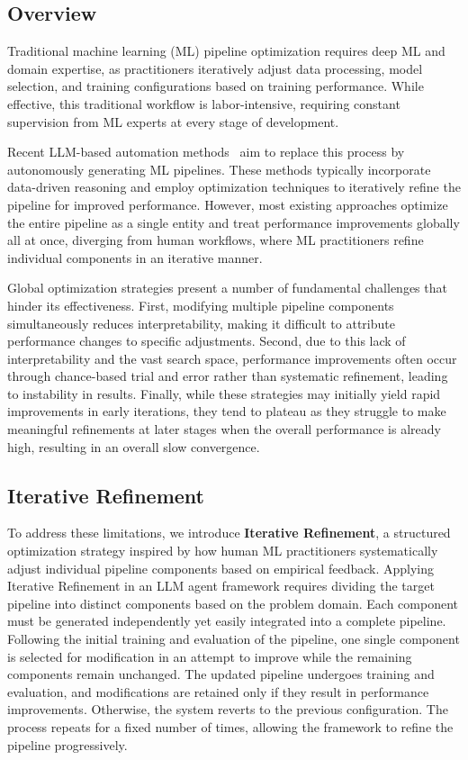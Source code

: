 \label{sec:method}
\subsection{Overview}
Traditional machine learning (ML) pipeline optimization requires deep ML and domain expertise, as practitioners iteratively adjust data processing, model selection, and training configurations based on training performance. While effective, this traditional workflow is labor-intensive, requiring constant supervision from ML experts at every stage of development.

Recent LLM-based automation methods~\citep{grosnit2024kaggleagent, trirat2024automlagent, hong2024datainterpreter, li2024autokaggle, guo2024dsagent} aim to replace this process by autonomously generating ML pipelines. These methods typically incorporate data-driven reasoning and employ optimization techniques to iteratively refine the pipeline for improved performance. However, most existing approaches optimize the entire pipeline as a single entity and treat performance improvements globally all at once, diverging from human workflows, where ML practitioners refine individual components in an iterative manner.

Global optimization strategies present a number of fundamental challenges that hinder its effectiveness. First, modifying multiple pipeline components simultaneously reduces interpretability, making it difficult to attribute performance changes to specific adjustments. Second, due to this lack of interpretability and the vast search space, performance improvements often occur through chance-based trial and error rather than systematic refinement, leading to instability in results. Finally, while these strategies may initially yield rapid improvements in early iterations, they tend to plateau as they struggle to make meaningful refinements at later stages when the overall performance is already high, resulting in an overall slow convergence.

\subsection{Iterative Refinement}
To address these limitations, we introduce \textbf{Iterative Refinement}, a structured optimization strategy inspired by how human ML practitioners systematically adjust individual pipeline components based on empirical feedback. Applying Iterative Refinement in an LLM agent framework requires dividing the target pipeline into distinct components based on the problem domain. Each component must be generated independently yet easily integrated into a complete pipeline. Following the initial training and evaluation of the pipeline, one single component is selected for modification in an attempt to improve while the remaining components remain unchanged. The updated pipeline undergoes training and evaluation, and modifications are retained only if they result in performance improvements. Otherwise, the system reverts to the previous configuration. The process repeats for a fixed number of times, allowing the framework to refine the pipeline progressively.


